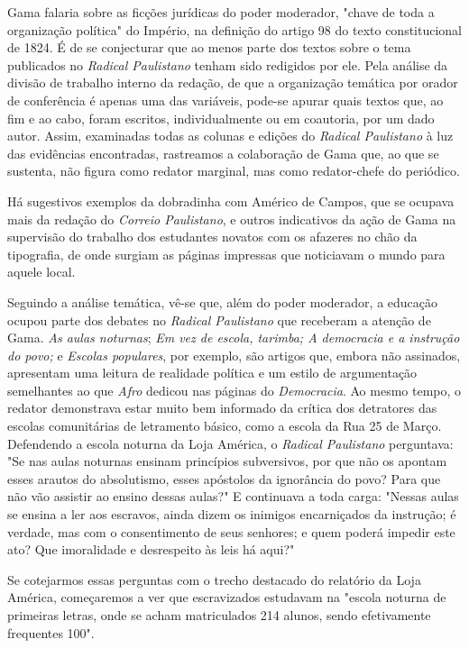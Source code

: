Gama falaria sobre as ficções jurídicas do poder moderador, "chave de
toda a organização política" do Império, na definição do artigo 98 do
texto constitucional de 1824. É de se conjecturar que ao menos parte dos
textos sobre o tema publicados no \emph{Radical Paulistano} tenham sido
redigidos por ele. Pela análise da divisão de trabalho interno da
redação, de que a organização temática por orador de conferência é
apenas uma das variáveis, pode-se apurar quais textos que, ao fim e ao
cabo, foram escritos, individualmente ou em coautoria, por um dado
autor. Assim, examinadas todas as colunas e edições do \emph{Radical
Paulistano} à luz das evidências encontradas, rastreamos a colaboração
de Gama que, ao que se sustenta, não figura como redator marginal, mas
como redator-chefe do periódico.

Há sugestivos exemplos da dobradinha com Américo de Campos, que se
ocupava mais da redação do \emph{Correio Paulistano}, e outros
indicativos da ação de Gama na supervisão do trabalho dos estudantes
novatos com os afazeres no chão da tipografia, de onde surgiam as
páginas impressas que noticiavam o mundo para aquele local.

Seguindo a análise temática, vê-se que, além do poder moderador, a
educação ocupou parte dos debates no \emph{Radical Paulistano} que
receberam a atenção de Gama. \emph{As aulas noturnas}; \emph{Em vez de
escola, tarimba; A democracia e a instrução do povo;} e \emph{Escolas
populares}, por exemplo, são artigos que, embora não assinados,
apresentam uma leitura de realidade política e um estilo de argumentação
semelhantes ao que \emph{Afro} dedicou nas páginas do \emph{Democracia}.
Ao mesmo tempo, o redator demonstrava estar muito bem informado da
crítica dos detratores das escolas comunitárias de letramento básico,
como a escola da Rua 25 de Março. Defendendo a escola noturna da Loja
América, o \emph{Radical Paulistano} perguntava: "Se nas aulas noturnas
ensinam princípios subversivos, por que não os apontam esses arautos do
absolutismo, esses apóstolos da ignorância do povo? Para que não vão
assistir ao ensino dessas aulas?" E continuava a toda carga: "Nessas
aulas se ensina a ler aos escravos, ainda dizem os inimigos encarniçados
da instrução; é verdade, mas com o consentimento de seus senhores; e
quem poderá impedir este ato? Que imoralidade e desrespeito às leis há
aqui?"

Se cotejarmos essas perguntas com o trecho destacado do relatório da
Loja América, começaremos a ver que escravizados estudavam na "escola
noturna de primeiras letras, onde se acham matriculados 214 alunos,
sendo efetivamente frequentes 100".

